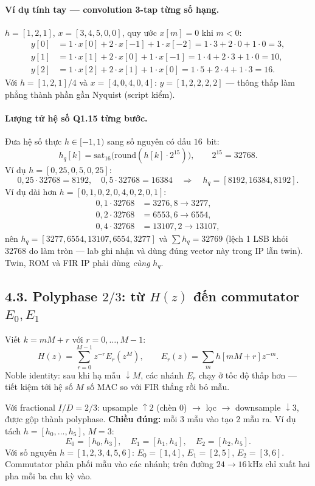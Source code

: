 \paragraph{Ví dụ tính tay --- convolution 3-tap từng số hạng.} $h=[1,2,1]$, $x=[3,4,5,0,0]$, quy ước $x[m]=0$ khi $m<0$:
\begin{align*}
y[0]&=1\cdot x[0]+2\cdot x[-1]+1\cdot x[-2]=1\cdot 3+2\cdot 0+1\cdot 0=3,\\
y[1]&=1\cdot x[1]+2\cdot x[0]+1\cdot x[-1]=1\cdot 4+2\cdot 3+1\cdot 0=10,\\
y[2]&=1\cdot x[2]+2\cdot x[1]+1\cdot x[0]=1\cdot 5+2\cdot 4+1\cdot 3=16.
\end{align*}
Với $h=[1,2,1]/4$ và $x=[4,0,4,0,4]$: $y=[1,2,2,2,2]$ --- thông thấp làm phẳng thành phần gần Nyquist (script kiểm).

\paragraph{Lượng tử hệ số Q1.15 từng bước.} Đưa hệ số thực $h\in[-1,1)$ sang số nguyên có dấu $16$~bit:
\[
h_q[k]=\mathrm{sat}_{16}\bigl(\mathrm{round}(h[k]\cdot 2^{15})\bigr),\qquad 2^{15}=32768.
\]
Ví dụ $h=[0{,}25,0{,}5,0{,}25]$:
\[
0{,}25\cdot 32768=8192,\quad 0{,}5\cdot 32768=16384
\quad\Rightarrow\quad h_q=[8192,16384,8192].
\]
Ví dụ dài hơn $h=[0{,}1,0{,}2,0{,}4,0{,}2,0{,}1]$:
\begin{align*}
0{,}1\cdot 32768&=3276{,}8\to 3277,\\
0{,}2\cdot 32768&=6553{,}6\to 6554,\\
0{,}4\cdot 32768&=13107{,}2\to 13107,
\end{align*}
nên $h_q=[3277,6554,13107,6554,3277]$ và $\sum h_q=32769$ (lệch 1 LSB khỏi $32768$ do làm tròn --- lab ghi nhận và dùng đúng vector này trong IP lẫn twin). Twin, ROM và FIR IP phải dùng \emph{cùng} $h_q$.

\subsection*{4.3. Polyphase $2/3$: từ $H(z)$ đến commutator $E_0,E_1$}

Viết $k=mM+r$ với $r=0,\ldots,M-1$:
\[
H(z)=\sum_{r=0}^{M-1}z^{-r}E_r(z^{M}),\qquad
E_r(z)=\sum_{m}h[mM+r]z^{-m}.
\]
Noble identity: sau khi hạ mẫu $\downarrow M$, các nhánh $E_r$ chạy ở tốc độ thấp hơn --- tiết kiệm tới hệ số $M$ số MAC so với FIR thẳng rồi bỏ mẫu.

Với fractional $I/D=2/3$: upsample $\uparrow 2$ (chèn 0) $\to$ lọc $\to$ downsample $\downarrow 3$, được gộp thành polyphase. \textbf{Chiều đúng:} mỗi 3 mẫu vào tạo 2 mẫu ra. Ví dụ tách $h=[h_0,\ldots,h_5]$, $M=3$:
\[
E_0=[h_0,h_3],\quad E_1=[h_1,h_4],\quad E_2=[h_2,h_5].
\]
Với số nguyên $h=[1,2,3,4,5,6]$: $E_0=[1,4]$, $E_1=[2,5]$, $E_2=[3,6]$. Commutator phân phối mẫu vào các nhánh; trên đường $24\to 16\,\text{kHz}$ chỉ xuất hai pha mỗi ba chu kỳ vào.

